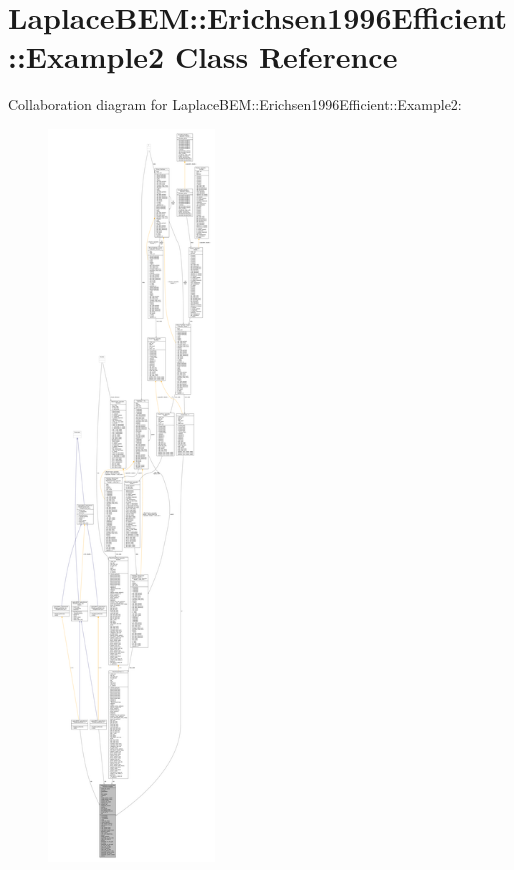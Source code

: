 \hypertarget{classLaplaceBEM_1_1Erichsen1996Efficient_1_1Example2}{}\section{Laplace\+B\+EM\+:\+:Erichsen1996\+Efficient\+:\+:Example2 Class Reference}
\label{classLaplaceBEM_1_1Erichsen1996Efficient_1_1Example2}


Collaboration diagram for Laplace\+B\+EM\+:\+:Erichsen1996\+Efficient\+:\+:Example2\+:\nopagebreak
\begin{figure}[H]
\begin{center}
\leavevmode
\includegraphics[height=550pt]{classLaplaceBEM_1_1Erichsen1996Efficient_1_1Example2__coll__graph}
\end{center}
\end{figure}
